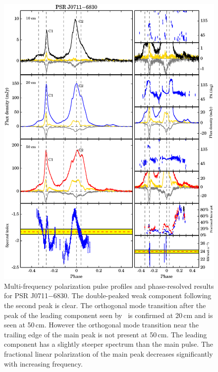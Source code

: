 \documentclass[useAMS,usenatbib]{mn2e}
\begin{document}
\begin{appendix}
\begin{figure}
\begin{center}
\includegraphics[width=6 in]{0711.ps}
\caption{Multi-frequency polarization pulse profiles and phase-resolved results for PSR J0711$-$6830. 
The double-peaked weak component following the second peak is clear.
%
The orthogonal mode transition after the peak of the leading component 
seen by~\citet{Yan11} is confirmed at 20\,cm and is seen at 50\,cm.
However the orthogonal mode transition near the trailing edge 
of the main peak is not present at 50\,cm.
%
The leading component has a slightly steeper spectrum than the main pulse. 
The fractional linear polarization of the main peak decreases significantly 
with increasing frequency. 
}
\label{0711}
\end{center}
\end{figure}


\end{appendix}
\end{document}
